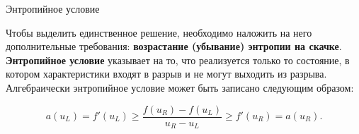 \documentclass[10pt,xcolor=pst,aspectratio=169]{beamer}
\begin{document}
\begin{frame}{Энтропийное условие}

    \transdissolve[duration=0.1]
    \justifying
    \large

    Чтобы выделить единственное решение, необходимо наложить на него дополнительные требования: \textbf{возрастание (убывание) энтропии на скачке}.\\

    \textbf{Энтропийное условие} указывает на то, что реализуется только то состояние, в котором характеристики входят в разрыв и не могут выходить из разрыва.\\

    Алгебраически энтропийное условие может быть записано следующим образом:

    \vspace{-2ex}

    \[
        a(u_{L}) = f'(u_{L}) \geq \frac{f(u_{R}) - f(u_{L})}{u_{R} - u_{L}} \geq f'(u_{R}) = a(u_{R}).
    \]


\end{frame}
\end{document}

